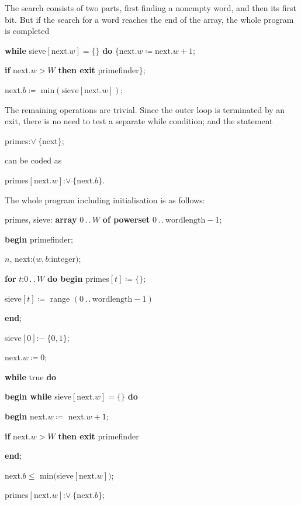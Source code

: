 The search consists of two parts, first finding a nonempty word, and then its first bit. But if the search for a word reaches the end of the array, the whole program is completed

\quad \textbf{while} sieve$[\text{next}.w] = \{\}$ \textbf{do} $\{\text{next}.w \coloneq \text{next}.w +1$;

\quad \quad \textbf{if} next.$w > W$ \textbf{then exit} primefinder$\}$;

\quad \quad next.$b\coloneq$ min$(\text{sieve}[\text{next}.w])$;

The remaining operations are trivial. Since the outer loop is terminated by an exit, there is no need to test a separate while condition; and the statement

\quad primes:$\vee\ \{$next$\}$;

\noindent
can be coded as

\quad primes$[\text{next}.w]$:$\vee\ \{\text{next}.b\}$.

The whole program including initialisation is as follows:

\quad primes, sieve: \textbf{array} $0\,.\,.\,W$ \textbf{of powerset} $0\,.\,.\,\text{wordlength} - 1$;

\quad \textbf{begin} primefinder;

\quad \quad $n$, next:$(w, b$:integer$)$;

\quad \quad \textbf{for} $t$:$0\,.\,.\,W$ \textbf{do begin} primes$[t] \coloneq \{\}$;

\quad \quad \quad sieve$[t] \coloneq$ range $(0\,.\,.\, \text{wordlength} - 1)$

\quad \quad \textbf{end};

\quad \quad sieve$[0]$:$-\ \{0, 1\}$;

\quad \quad next.$w\coloneq 0$;

\quad \quad \textbf{while} true \textbf{do}

\quad \quad \quad \textbf{begin while} sieve$[\text{next}.w] = \{\}$ \textbf{do}

\quad \quad \quad \quad \textbf{begin} next.$w\coloneq$ next.$w + 1$;

\quad \quad \quad \quad \quad \textbf{if} next.$w > W$ \textbf{then exit} primefinder

\quad \quad \quad \quad \textbf{end};

\quad \quad \quad \quad next.$b\leqslant$ min$($sieve$[\text{next}.w])$;

\quad \quad \quad \quad primes$[\text{next}.w]$:$\vee\ \{\text{next}.b\}$;


